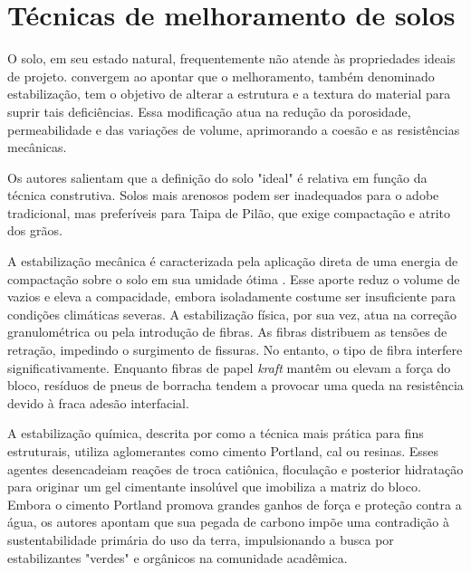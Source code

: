 \section{Técnicas de melhoramento de solos}


O solo, em seu estado natural, frequentemente não atende às propriedades ideais de projeto.  convergem ao apontar que o melhoramento, também denominado estabilização, tem o objetivo de alterar a estrutura e a textura do material para suprir tais deficiências. Essa modificação atua na redução da porosidade, permeabilidade e das variações de volume, aprimorando a coesão e as resistências mecânicas.

Os autores salientam que a definição do solo "ideal" é relativa em função da técnica construtiva. Solos mais arenosos podem ser inadequados para o adobe tradicional, mas preferíveis para Taipa de Pilão, que exige compactação e atrito dos grãos.

A estabilização mecânica é caracterizada pela aplicação direta de uma energia de compactação sobre o solo em sua umidade ótima \cite{Barroso2019,Junior2021,Silva2019}. Esse aporte reduz o volume de vazios e eleva a compacidade, embora isoladamente costume ser insuficiente para condições climáticas severas. A estabilização física, por sua vez, atua na correção granulométrica ou pela introdução de fibras. As fibras distribuem as tensões de retração, impedindo o surgimento de fissuras. No entanto, o tipo de fibra interfere significativamente. Enquanto fibras de papel \textit{kraft} mantêm ou elevam a força do bloco, resíduos de pneus de borracha tendem a provocar uma queda na resistência devido à fraca adesão interfacial.

A estabilização química, descrita por  como a técnica mais prática para fins estruturais, utiliza aglomerantes como cimento Portland, cal ou resinas. Esses agentes desencadeiam reações de troca catiônica, floculação e posterior hidratação para originar um gel cimentante insolúvel que imobiliza a matriz do bloco. Embora o cimento Portland promova grandes ganhos de força e proteção contra a água, os autores apontam que sua pegada de carbono impõe uma contradição à sustentabilidade primária do uso da terra, impulsionando a busca por estabilizantes "verdes" e orgânicos na comunidade acadêmica.

